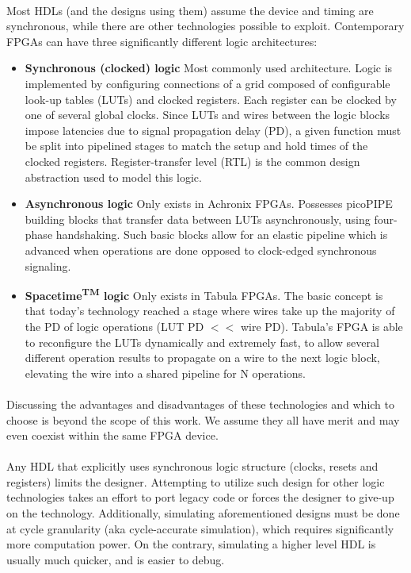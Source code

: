 \paragraph{}Most HDLs (and the designs using them) assume the device and timing are synchronous, while there are other technologies possible to exploit. Contemporary FPGAs can have three significantly different logic architectures: 
\begin{itemize}
\item \textbf{Synchronous (clocked) logic} \quad Most commonly used architecture. Logic is implemented by configuring connections of a grid composed of configurable look-up tables (LUTs) and clocked registers. Each register can be clocked by one of several global clocks. Since LUTs and wires between the logic blocks impose latencies due to signal propagation delay (PD), a given function must be split into pipelined stages to match the setup and hold times of the clocked registers. 
Register-transfer level (RTL) is the common design abstraction used to model this logic.
\item \textbf{Asynchronous logic} \quad Only exists in Achronix FPGAs. Possesses picoPIPE building blocks that transfer data between LUTs asynchronously, using four-phase handshaking. Such basic blocks allow for an elastic pipeline which is advanced when operations are done opposed to clock-edged synchronous signaling.
\item \textbf{Spacetime\textsuperscript{TM}\cite{tabula2014spacetime} logic} \quad Only exists in Tabula FPGAs. The basic concept is that today's technology reached a stage where wires take up the majority of the PD of logic operations (LUT PD $<<$ wire PD). Tabula's FPGA is able to reconfigure the LUTs dynamically and extremely fast, to allow several different operation results to propagate on a wire to the next logic block, elevating the wire into a shared pipeline for N operations. 
\end{itemize}
\paragraph{}Discussing the advantages and disadvantages of these technologies and which to choose is beyond the scope of this work. We assume they all have merit and may even coexist within the same FPGA device.  
\paragraph{}Any HDL that explicitly uses synchronous logic structure (clocks, resets and registers) limits the designer. Attempting to utilize such design for other logic technologies takes an effort to port legacy code or forces the designer to give-up on the technology. Additionally, simulating aforementioned designs must be done at cycle granularity (aka cycle-accurate simulation), which requires significantly more computation power. On the contrary, simulating a higher level HDL is usually much quicker, and is easier to debug.   
